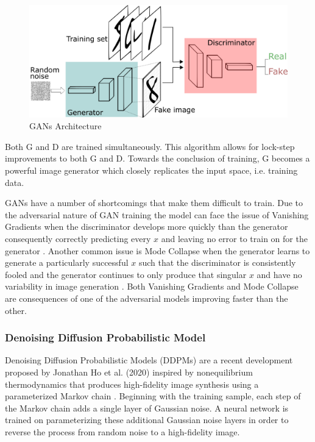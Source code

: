 \documentclass[%
 reprint,
 amsmath,amssymb,
 aps,
]{revtex4-2}
\begin{document}
\begin{figure}[h]
    \includegraphics[width=0.9\columnwidth]{GANs.png}
    \caption{\label{fig:GAN} GANs Architecture \cite{pathmind}}
\end{figure}



Both G and D are trained simultaneously. This algorithm allows for lock-step improvements to both G and D. Towards the conclusion of training, G becomes a powerful image generator which closely replicates the input space, i.e. training data.


GANs have a number of shortcomings that make them difficult to train. Due to the adversarial nature of GAN training the model can face the issue of Vanishing Gradients when the discriminator develops more quickly than the generator consequently correctly predicting every $x$ and leaving no error to train on for the generator \cite{google}. Another common issue is Mode Collapse when the generator learns to generate a particularly successful $x$ such that the discriminator is consistently fooled and the generator continues to only produce that singular $x$ and have no variability in image generation \cite{google}. Both Vanishing Gradients and Mode Collapse are consequences of one of the adversarial models improving faster than the other.


\subsubsection{Denoising Diffusion Probabilistic Model}

Denoising Diffusion Probabilistic Models (DDPMs) are a recent development proposed by Jonathan Ho et al. (2020) inspired by nonequilibrium thermodynamics that produces high-fidelity image synthesis using a parameterized Markov chain \cite{ho2020denoising}. Beginning with the training sample, each step of the Markov chain adds a single layer of Gaussian noise. A neural network is trained on parameterizing these additional Gaussian noise layers in order to reverse the process from random noise to a high-fidelity image.
\end{document}
